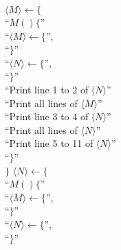 \documentclass[letterpaper]{article}
\begin{document}
\begin{multicols}{2}
    \begin{minipage}{0.4\textwidth}
        \begin{algorithm}[H]
            \caption{$N()$}
            $ \langle M \rangle \gets \{$\\
            \nl \hspace{0.5cm}``$M()\{$''\\
            \nl \hspace{1.0cm}``$ \langle M \rangle \gets \{$'',\\
            \nl \hspace{1.0cm}``$\}$''\\
            \nl \hspace{1.0cm}``$ \langle N \rangle \gets \{$'',\\
            \nl \hspace{1.0cm}``$\}$''\\
            \nl \hspace{1.0cm}``Print line 1 to 2 of $\langle N \rangle$''\\
            \nl \hspace{1.0cm}``Print all lines of $\langle M \rangle$''\\
            \nl \hspace{1.0cm}``Print line 3 to 4 of $\langle N \rangle$''\\
            \nl \hspace{1.0cm}``Print all lines of $\langle N \rangle$''\\
            \nl \hspace{1.0cm}``Print line 5 to 11 of $\langle N \rangle$''\\
            \nl \hspace{0.5cm}``$\}$''\\
            $ \}$\;
            \setcounter{AlgoLine}{0}
            $ \langle N \rangle \gets \{$\\
            \nl \hspace{0.5cm}``$M()\{$''\\
            \nl \hspace{1.0cm}``$ \langle M \rangle \gets \{$'',\\
            \nl \hspace{1.0cm}``$\}$''\\
            \nl \hspace{1.0cm}``$ \langle N \rangle \gets \{$'',\\
            \nl \hspace{1.0cm}``$\}$''\\

\end{algorithm}
\end{minipage}
\end{multicols}
\end{document}

